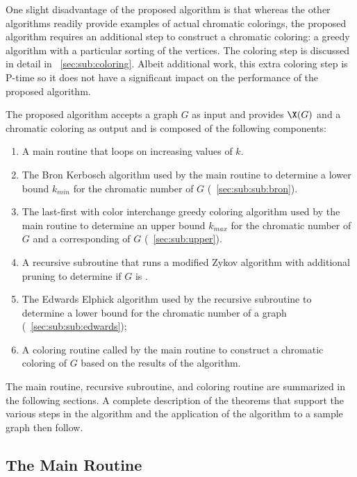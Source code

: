 One slight disadvantage of the proposed algorithm is that whereas the other algorithms readily provide examples of
actual chromatic colorings, the proposed algorithm requires an additional step to construct a chromatic coloring: a
greedy algorithm with a particular sorting of the vertices.  The coloring step is discussed in detail in
\sectionname~\ref{sec:sub:coloring}.  Albeit additional work, this extra coloring step is P-time so it does not
have a significant impact on the performance of the proposed algorithm.

The proposed algorithm accepts a graph \(G\) as input and provides \(\X(G)\) and a chromatic coloring as output and
is composed of the following components:
\begin{enumerate}
\item A main routine that loops on increasing values of \(k\).
\item The Bron Kerbosch algorithm used by the main routine to determine a lower bound \(k_{min}\) for the chromatic
  number of \(G\) (\sectionname~\ref{sec:sub:sub:bron}).
\item The last-first with color interchange greedy coloring algorithm used by the main routine to determine an
  upper bound \(k_{max}\) for the chromatic number of \(G\) and a corresponding  of \(G\)
  (\sectionname~\ref{sec:sub:upper}).
\item A recursive subroutine that runs a modified Zykov algorithm with additional pruning to determine if
  \(G\) is .
\item The Edwards Elphick algorithm used by the recursive subroutine to determine a lower bound for the chromatic
  number of a graph (\sectionname~\ref{sec:sub:sub:edwards});
\item A coloring routine called by the main routine to construct a chromatic coloring of \(G\) based on the results
  of the algorithm.
\end{enumerate}

The main routine, recursive subroutine, and coloring routine are summarized in the following sections.  A complete
description of the theorems that support the various steps in the algorithm and the application of the algorithm to
a sample graph then follow.

\subsection{The Main Routine}\label{sec:sub:main}

